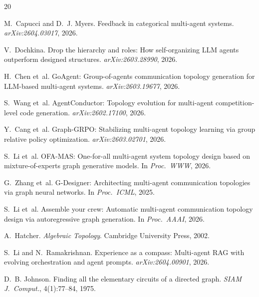\documentclass[10pt,twocolumn]{article}
\begin{document}

\begin{thebibliography}{20}

M.~Capucci and D.~J. Myers.
\newblock Feedback in categorical multi-agent systems.
\newblock \emph{arXiv:2604.03017}, 2026.

V.~Dochkina.
\newblock Drop the hierarchy and roles: How self-organizing {LLM} agents
  outperform designed structures.
\newblock \emph{arXiv:2603.28990}, 2026.

H.~Chen et~al.
\newblock GoAgent: Group-of-agents communication topology generation for
  {LLM}-based multi-agent systems.
\newblock \emph{arXiv:2603.19677}, 2026.

S.~Wang et~al.
\newblock AgentConductor: Topology evolution for multi-agent competition-level
  code generation.
\newblock \emph{arXiv:2602.17100}, 2026.

Y.~Cang et~al.
\newblock Graph-GRPO: Stabilizing multi-agent topology learning via group
  relative policy optimization.
\newblock \emph{arXiv:2603.02701}, 2026.

S.~Li et~al.
\newblock OFA-MAS: One-for-all multi-agent system topology design based on
  mixture-of-experts graph generative models.
\newblock In \emph{Proc.\ WWW}, 2026.

G.~Zhang et~al.
\newblock G-Designer: Architecting multi-agent communication topologies via
  graph neural networks.
\newblock In \emph{Proc.\ ICML}, 2025.

S.~Li et~al.
\newblock Assemble your crew: Automatic multi-agent communication topology
  design via autoregressive graph generation.
\newblock In \emph{Proc.\ AAAI}, 2026.

A.~Hatcher.
\newblock \emph{Algebraic Topology}.
\newblock Cambridge University Press, 2002.

S.~Li and N.~Ramakrishnan.
\newblock Experience as a compass: Multi-agent {RAG} with evolving
  orchestration and agent prompts.
\newblock \emph{arXiv:2604.00901}, 2026.

D.~B. Johnson.
\newblock Finding all the elementary circuits of a directed graph.
\newblock \emph{SIAM J.\ Comput.}, 4(1):77--84, 1975.


\end{thebibliography}
\end{document}
